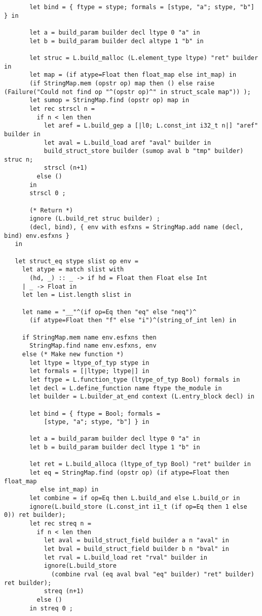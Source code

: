 \documentclass[main.tex]{subfiles}
\begin{document}
\begin{lstlisting}
       let bind = { ftype = stype; formals = [stype, "a"; stype, "b"] } in

       let a = build_param builder decl ltype 0 "a" in
       let b = build_param builder decl altype 1 "b" in

       let struc = L.build_malloc (L.element_type ltype) "ret" builder in
       let map = (if atype=Float then float_map else int_map) in
       (if StringMap.mem (opstr op) map then () else raise (Failure("Could not find op "^(opstr op)^" in struct_scale map")) );
       let sumop = StringMap.find (opstr op) map in
       let rec strscl n = 
         if n < len then 
           let aref = L.build_gep a [|l0; L.const_int i32_t n|] "aref" builder in
           let aval = L.build_load aref "aval" builder in
           build_struct_store builder (sumop aval b "tmp" builder) struc n;
           strscl (n+1)
         else ()
       in
       strscl 0 ;

       (* Return *)
       ignore (L.build_ret struc builder) ;
       (decl, bind), { env with esfxns = StringMap.add name (decl, bind) env.esfxns }
   in
   
   let struct_eq stype slist op env =
     let atype = match slist with
       (hd, _) :: _ -> if hd = Float then Float else Int
     | _ -> Float in
     let len = List.length slist in

     let name = "__"^(if op=Eq then "eq" else "neq")^
       (if atype=Float then "f" else "i")^(string_of_int len) in

     if StringMap.mem name env.esfxns then
       StringMap.find name env.esfxns, env
     else (* Make new function *)
       let ltype = ltype_of_typ stype in
       let formals = [|ltype; ltype|] in
       let ftype = L.function_type (ltype_of_typ Bool) formals in
       let decl = L.define_function name ftype the_module in
       let builder = L.builder_at_end context (L.entry_block decl) in

       let bind = { ftype = Bool; formals =
           [stype, "a"; stype, "b"] } in

       let a = build_param builder decl ltype 0 "a" in
       let b = build_param builder decl ltype 1 "b" in

       let ret = L.build_alloca (ltype_of_typ Bool) "ret" builder in
       let eq = StringMap.find (opstr op) (if atype=Float then float_map
          else int_map) in
       let combine = if op=Eq then L.build_and else L.build_or in
       ignore(L.build_store (L.const_int i1_t (if op=Eq then 1 else 0)) ret builder);
       let rec streq n = 
         if n < len then
           let aval = build_struct_field builder a n "aval" in
           let bval = build_struct_field builder b n "bval" in
           let rval = L.build_load ret "rval" builder in
           ignore(L.build_store
             (combine rval (eq aval bval "eq" builder) "ret" builder) ret builder);
           streq (n+1)
         else ()
       in streq 0 ;


\end{lstlisting}
\end{document}
